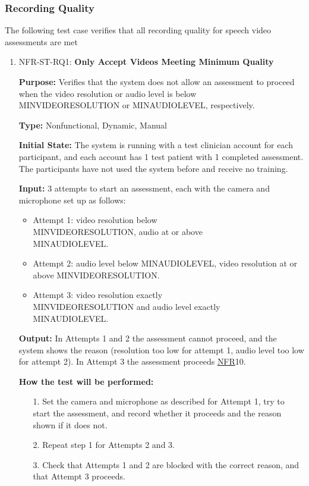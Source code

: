 \documentclass[12pt, titlepage]{article}
\newcommand{\srsnfr}[1]{\href{https://github.com/Nour-Fawaz/MacaBoca/blob/main/pdfs/SRS/SRS.pdf}{NFR}}
\renewcommand{\_}{\oldunderscore\allowbreak}
\begin{document}
\subsubsection{Recording Quality}
The following test case verifies that all recording quality for speech video assessments are met 
\begin{enumerate}
  \item NFR-ST-RQ1: \textbf{Only Accept Videos Meeting Minimum Quality\\}
  \begin{mdframed}[linewidth=0.5mm]
      \textbf{Purpose:} Verifies that the system does not allow an assessment to proceed when the video resolution or audio level is below \\ MIN\_VIDEO\_RESOLUTION or MIN\_AUDIO\_LEVEL, respectively.  \par
      \textbf{Type:} Nonfunctional, Dynamic, Manual \par
      \textbf{Initial State:} The system is running with a test clinician account for each participant, and each account has 1 test patient with 1 completed assessment. The participants have not used the system before and receive no training. \par
      \textbf{Input:} 3 attempts to start an assessment, each with the camera and microphone set up as follows:
      \begin{itemize}
        \item Attempt 1: video resolution below \\ MIN\_VIDEO\_RESOLUTION, audio at or above \\ MIN\_AUDIO\_LEVEL.
        \item Attempt 2: audio level below MIN\_AUDIO\_LEVEL, video resolution at or above MIN\_VIDEO\_RESOLUTION.
        \item Attempt 3: video resolution exactly \\ MIN\_VIDEO\_RESOLUTION and audio level exactly \\ MIN\_AUDIO\_LEVEL.
      \end{itemize}
      \textbf{Output:} In Attempts 1 and 2 the assessment cannot proceed, and the system shows the reason (resolution too low for attempt 1, audio level too low for attempt 2). In Attempt 3 the assessment proceeds \srsnfr*{10}. \par
      \textbf{How the test will be performed:}
      \begin{enumerate}
      \item[1.] Set the camera and microphone as described for Attempt 1, try to start the assessment, and record whether it proceeds and the reason shown if it does not.
      \item[2.] Repeat step 1 for Attempts 2 and 3.
      \item[3.] Check that Attempts 1 and 2 are blocked with the correct reason, and that Attempt 3 proceeds.
      \end{enumerate}
  \end{mdframed}
\end{enumerate}
\end{document}
